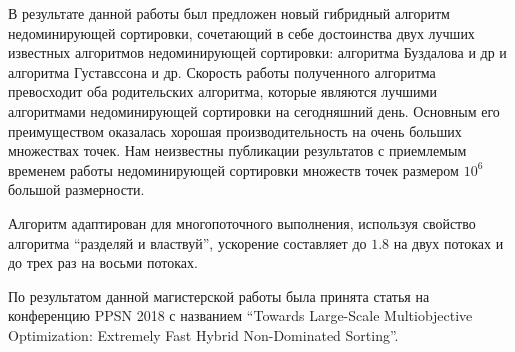 \startconclusionpage

В результате данной работы был предложен новый гибридный алгоритм недоминирующей сортировки, сочетающий в себе достоинства двух лучших известных алгоритмов недоминирующей сортировки: алгоритма Буздалова и др и алгоритма Густавссона и др. Скорость работы полученного алгоритма превосходит оба родительских алгоритма, которые являются лучшими алгоритмами недоминирующей сортировки на сегодняшний день. Основным его преимуществом оказалась хорошая производительность на очень больших множествах точек. Нам неизвестны публикации результатов с приемлемым временем работы недоминирующей сортировки множеств точек размером $10^6$ большой размерности.

Алгоритм адаптирован для многопоточного выполнения, используя свойство алгоритма ``разделяй и властвуй'', ускорение составляет до $1.8$ на двух потоках и до трех раз на восьми потоках.

По результатом данной магистерской работы была принята статья на конференцию PPSN 2018 с названием ``Towards Large-Scale Multiobjective Optimization: Extremely Fast Hybrid Non-Dominated Sorting''. 
